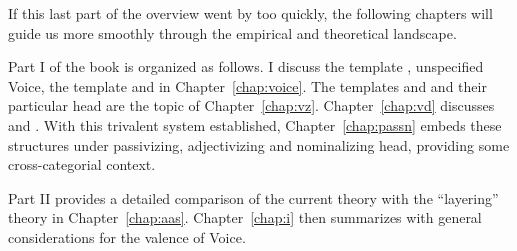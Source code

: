 If this last part of the overview went by too quickly, the following chapters will guide us more smoothly through the empirical and theoretical landscape.

Part I of the book is organized as follows. I discuss the template {\tkal}, unspecified Voice, the template {\tpie} and {\va} in Chapter~\ref{chap:voice}. The templates {\tnif} and {\thit} and their particular head {\vz} are the topic of Chapter~\ref{chap:vz}. Chapter~\ref{chap:vd} discusses {\thif} and {\vd}. With this trivalent system established, Chapter~\ref{chap:passn} embeds these structures under passivizing, adjectivizing and nominalizing head, providing some cross-categorial context.

Part II provides a detailed comparison of the current theory with the ``layering'' theory in Chapter~\ref{chap:aas}. Chapter~\ref{chap:i} then summarizes with general considerations for the valence of Voice.


